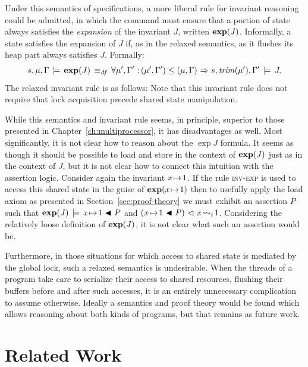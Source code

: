 \documentclass[11pt]{report}         %
\begin{document}
Under this semantics of specifications, a more liberal rule for invariant reasoning could be admitted, in which the command must ensure that a portion of state always satisfies the \emph{expansion} of the invariant $J$, written $\mathbf{exp}({J})$. Informally, a state satisfies the expansion of $J$ if, as in the relaxed semantics, as it flushes its heap part always satisfies $J$. Formally: \[ s,\mu,\Gamma \,\models\, \mathbf{exp}({J}) \operatorname{\;\equiv_{\mathit{df}}\;} \forall \mu',\Gamma' \operatorname{\,:\,} (\mu',\Gamma') \leq (\mu,\Gamma) \operatorname{\,\Rightarrow\,} s,\mathit{trim}(\mu'),\Gamma' \,\models\, J. \] The relaxed invariant rule is as follows:  Note that this invariant rule does not require that lock acquisition precede shared state manipulation. 

While this semantics and invariant rule seems, in principle, superior to those presented in Chapter~\ref{ch:multiprocessor}, it has disadvantages as well. Most significantly, it is not clear how to reason about the $\exp{J}$ formula. It seems as though it should be possible to load and store in the context of $\mathbf{exp}({J})$ just as in the context of $J$, but it is not clear how to connect this intuition with the assertion logic. Consider again the invariant $x \!\mapsto\! 1$. If the rule \textsc{inv-exp} is used to access this shared state in the guise of $\mathbf{exp}({x \!\mapsto\! 1})$ then to usefully apply the load axiom as presented in Section~\ref{sec:proof-theory} we must exhibit an assertion $P$ such that $\mathbf{exp}({J}) \,\models\, x \!\mapsto\! 1 \operatorname{\,\blacktriangleleft\,} P$ and $(x \!\mapsto\! 1 \operatorname{\,\blacktriangleleft\,} P) \operatorname{\,\vartriangleleft\,} x \!\leadsto_{i}\! 1$. Considering the relatively loose definition of $\mathbf{exp}({J})$, it is not clear what such an assertion would be. 

Furthermore, in those situations for which access to shared state is mediated by the global lock, such a relaxed semantics is undesirable. When the threads of a program take care to serialize their access to shared resources, flushing their buffers before and after such accesses, it is an entirely unnecessary complication to assume otherwise. Ideally a semantics and proof theory would be found which allows reasoning about both kinds of programs, but that remains as future work. 

\chapter{Related Work}
\label{ch:related-work}
\end{document}
